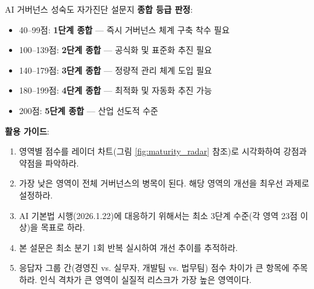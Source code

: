 \begin{practicaltool}{AI 거버넌스 성숙도 자가진단 설문지}
\textbf{종합 등급 판정}:
\begin{itemize}
    \item 40--99점: \textbf{1단계 종합} --- 즉시 거버넌스 체계 구축 착수 필요
    \item 100--139점: \textbf{2단계 종합} --- 공식화 및 표준화 추진 필요
    \item 140--179점: \textbf{3단계 종합} --- 정량적 관리 체계 도입 필요
    \item 180--199점: \textbf{4단계 종합} --- 최적화 및 자동화 추진 가능
    \item 200점: \textbf{5단계 종합} --- 산업 선도적 수준
\end{itemize}

\textbf{활용 가이드}:
\begin{enumerate}
    \item 영역별 점수를 레이더 차트(그림 \ref{fig:maturity_radar} 참조)로 시각화하여 강점과 약점을 파악하라.
    \item 가장 낮은 영역이 전체 거버넌스의 병목이 된다. 해당 영역의 개선을 최우선 과제로 설정하라.
    \item AI 기본법 시행(2026.1.22)에 대응하기 위해서는 최소 3단계 수준(각 영역 23점 이상)을 목표로 하라.
    \item 본 설문은 최소 분기 1회 반복 실시하여 개선 추이를 추적하라.
    \item 응답자 그룹 간(경영진 vs. 실무자, 개발팀 vs. 법무팀) 점수 차이가 큰 항목에 주목하라. 인식 격차가 큰 영역이 실질적 리스크가 가장 높은 영역이다.
\end{enumerate}
\end{practicaltool}
